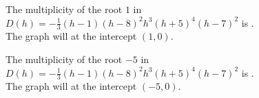 \documentclass{ximera}
\begin{document}
\begin{exercise}
\begin{question}



The multiplicity of the root $1$ in $D(h) = -\frac{1}{3} (h - 1) (h - 8)^2 h^3 (h + 5)^4 (h - 7)^2$ is . \\



The graph will  at the intercept $(1, 0)$.




\end{question}












\begin{question}



The multiplicity of the root $-5$ in $D(h) = -\frac{1}{3} (h - 1) (h - 8)^2 h^3 (h + 5)^4 (h - 7)^2$ is . \\



The graph will  at the intercept $(-5, 0)$.




\end{question}








\end{exercise}
\end{document}
